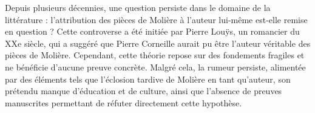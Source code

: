 \vspace{\baselineskip}
\hspace{0,5cm}Depuis plusieurs décennies, une question persiste dans le domaine de la
littérature : l'attribution des pièces de Molière à l'auteur lui-même est-elle
remise en question ? Cette controverse a été initiée par Pierre Louÿs, un
romancier du XXe siècle, qui a suggéré que Pierre Corneille aurait pu être
l'auteur véritable des pièces de Molière. Cependant, cette théorie repose sur
des fondements fragiles et ne bénéficie d'aucune preuve concrète. Malgré cela,
la rumeur persiste, alimentée par des éléments tels que l'éclosion tardive de
Molière en tant qu'auteur, son prétendu manque d'éducation et de culture, ainsi
que l'absence de preuves manuscrites permettant de réfuter directement cette
hypothèse.